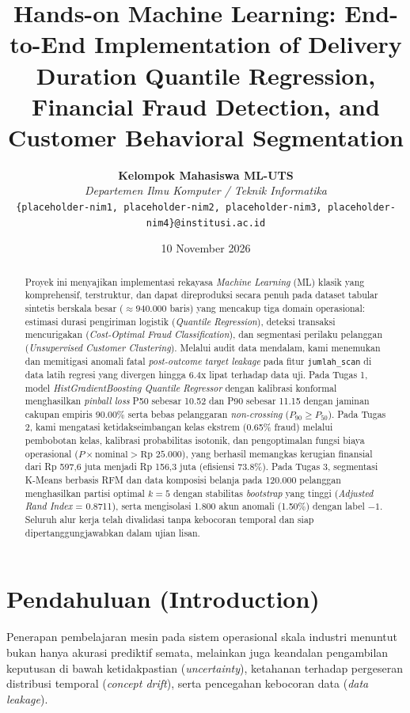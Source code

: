 \documentclass[11pt,a4paper]{article}
\title{\vspace{-1.5cm}\LARGE\textbf{Hands-on Machine Learning: End-to-End Implementation of Delivery Duration Quantile Regression, Financial Fraud Detection, and Customer Behavioral Segmentation}\vspace{0.3cm}}
\author{
    \textbf{Kelompok Mahasiswa ML-UTS} \\
    \textit{Departemen Ilmu Komputer / Teknik Informatika} \\
    \texttt{\{placeholder-nim1, placeholder-nim2, placeholder-nim3, placeholder-nim4\}@institusi.ac.id}
}
\date{10 November 2026}
\begin{document}
\maketitle

\begin{abstract}
Proyek ini menyajikan implementasi rekayasa \textit{Machine Learning} (ML) klasik yang komprehensif, terstruktur, dan dapat direproduksi secara penuh pada dataset tabular sintetis berskala besar ($\approx 940.000$ baris) yang mencakup tiga domain operasional: estimasi durasi pengiriman logistik (\textit{Quantile Regression}), deteksi transaksi mencurigakan (\textit{Cost-Optimal Fraud Classification}), dan segmentasi perilaku pelanggan (\textit{Unsupervised Customer Clustering}). Melalui audit data mendalam, kami menemukan dan memitigasi anomali fatal \textit{post-outcome target leakage} pada fitur \texttt{jumlah\_scan} di data latih regresi yang divergen hingga 6.4x lipat terhadap data uji. Pada Tugas 1, model \textit{HistGradientBoosting Quantile Regressor} dengan kalibrasi konformal menghasilkan \textit{pinball loss} P50 sebesar 10.52 dan P90 sebesar 11.15 dengan jaminan cakupan empiris 90.00\% serta bebas pelanggaran \textit{non-crossing} ($P_{90} \ge P_{50}$). Pada Tugas 2, kami mengatasi ketidakseimbangan kelas ekstrem (0.65\% fraud) melalui pembobotan kelas, kalibrasi probabilitas isotonik, dan pengoptimalan fungsi biaya operasional ($P \times \text{nominal} > \text{Rp } 25.000$), yang berhasil memangkas kerugian finansial dari Rp 597,6 juta menjadi Rp 156,3 juta (efisiensi 73.8\%). Pada Tugas 3, segmentasi K-Means berbasis RFM dan data komposisi belanja pada 120.000 pelanggan menghasilkan partisi optimal $k=5$ dengan stabilitas \textit{bootstrap} yang tinggi (\textit{Adjusted Rand Index} = 0.8711), serta mengisolasi 1.800 akun anomali (1.50\%) dengan label $-1$. Seluruh alur kerja telah divalidasi tanpa kebocoran temporal dan siap dipertanggungjawabkan dalam ujian lisan.
\end{abstract}

\vspace{0.3cm}

\section{Pendahuluan (Introduction)}
Penerapan pembelajaran mesin pada sistem operasional skala industri menuntut bukan hanya akurasi prediktif semata, melainkan juga keandalan pengambilan keputusan di bawah ketidakpastian (\textit{uncertainty}), ketahanan terhadap pergeseran distribusi temporal (\textit{concept drift}), serta pencegahan kebocoran data (\textit{data leakage}).
\end{document}
